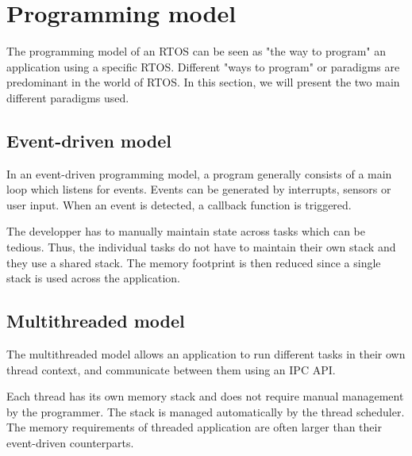 \section{Programming model}
The programming model of an RTOS can be seen as "the way to program" an application using a specific RTOS.
Different "ways to program" or paradigms are predominant in the world of RTOS.
In this section, we will present the two main different paradigms used.


\subsection{Event-driven model}
In an event-driven programming model, a program generally consists of a main loop which listens for events.
Events can be generated by interrupts, sensors or user input.
When an event is detected, a callback function is triggered.

The developper has to manually maintain state across tasks which can be tedious.
Thus, the individual tasks do not have to maintain their own stack and they use a shared stack.
The memory footprint is then reduced since a single stack is used across the application.

\subsection{Multithreaded model}
The multithreaded model allows an application to run different tasks in their own thread context,
    and communicate between them using an IPC API.

Each thread has its own memory stack and does not require manual management by the programmer.
The stack is managed automatically by the thread scheduler.
The memory requirements of threaded application are often larger than their event-driven counterparts.